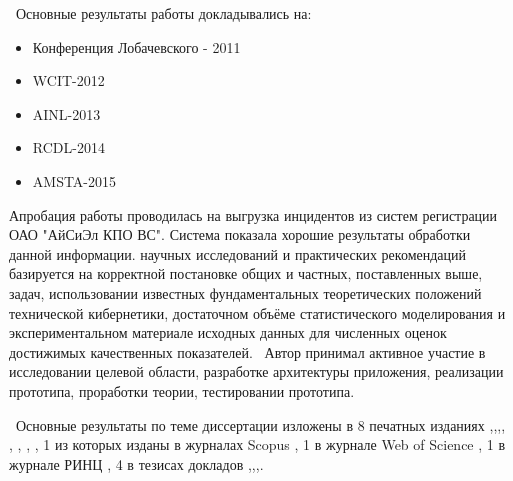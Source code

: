 \probation\
Основные результаты работы докладывались на:
\begin{itemize}
	\item Конференция Лобачевского - 2011
	\item WCIT-2012
	\item AINL-2013
	\item RCDL-2014
	\item AMSTA-2015
\end{itemize}
Апробация работы проводилась на выгрузка инцидентов из систем регистрации ОАО "АйСиЭл КПО ВС". Система показала хорошие результаты обработки данной информации.
\reliability научных исследований и практических рекомендаций
базируется на корректной постановке общих и частных, поставленных выше,
задач, использовании известных фундаментальных теоретических положений
технической кибернетики, достаточном объёме статистического моделирования
и экспериментальном материале исходных данных для численных оценок
достижимых качественных показателей.
\contribution\ Автор принимал активное участие в исследовании целевой области, разработке архитектуры приложения, реализации прототипа, проработки теории, тестировании прототипа.

\publications\ Основные результаты по теме диссертации изложены в 8 печатных изданиях  \cite{Lobachevskii},\cite{WCIT-2012},\cite{AINL-2013},\cite{ISGZ}, \cite{IJSE-1}, \cite{IJSE-2}, \cite{RCDL-2014}, \cite{AMSTA-2015},
1 из которых изданы в журналах Scopus \cite{RCDL-2014}, 1 в журнале Web of Science \cite{AMSTA-2015}, 1 в журнале РИНЦ  \cite{ISGZ}, 
4 в тезисах докладов \cite{Lobachevskii},\cite{WCIT-2012},\cite{AINL-2013},\cite{ISGZ}.



